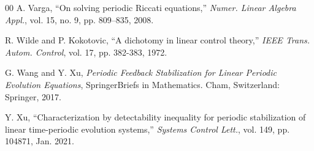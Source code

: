 \documentclass{IEEEtran}
\begin{document}
\begin{thebibliography}{00}
		A. Varga, ``On solving periodic Riccati equations,''
		\textit{Numer. Linear Algebra Appl.}, vol. 15, no. 9, pp. 809--835, 2008.
		
		R. Wilde and P. Kokotovic,
		``A dichotomy in linear control theory,''
		\textit{IEEE Trans. Autom. Control}, vol. 17, pp. 382-383, 1972.
		
		G. Wang and Y. Xu,
		\textit{Periodic Feedback Stabilization for Linear Periodic Evolution Equations},
		SpringerBriefs in Mathematics. Cham, Switzerland: Springer, 2017.
		
		Y. Xu, ``Characterization by detectability inequality for periodic stabilization of linear time-periodic evolution systems,''
		\textit{Systems Control Lett.}, vol. 149, pp. 104871, Jan. 2021.
		
		
		
		
		
		
		
		
	\end{thebibliography}
	
	
	
	
	
	
\end{document}
